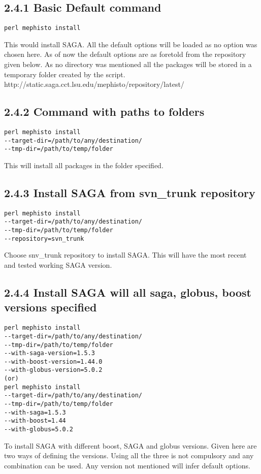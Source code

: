 \documentclass[a4paper,10pt]{article}
\begin{document}
\begin{multicols}{2}
\subsection*{\normalsize 2.4.1 Basic Default command}
\begin{verbatim}
perl mephisto install 
\end{verbatim}
This would install SAGA. All the default options will be loaded as no
option was chosen here. As of now the default options are as foretold 
from the repository given below. As no directory was mentioned all the 
packages will be stored in a temporary folder created by the script.
http://static.saga.cct.lsu.edu/mephisto/repository/latest/
\subsection*{\normalsize 2.4.2 Command with paths to folders}
\begin{verbatim}
perl mephisto install 
--target-dir=/path/to/any/destination/ 
--tmp-dir=/path/to/temp/folder 
\end{verbatim}
This will install all packages in the folder specified. 
\subsection*{\normalsize 2.4.3 Install SAGA from svn\_trunk repository}
\begin{verbatim}
perl mephisto install 
--target-dir=/path/to/any/destination/ 
--tmp-dir=/path/to/temp/folder 
--repository=svn_trunk
\end{verbatim}
Choose snv\_trunk repository to install SAGA. This will have the most
recent and tested working SAGA version. 
\subsection*{\normalsize 2.4.4 Install SAGA will all saga, globus, boost versions specified}
\begin{verbatim}
perl mephisto install 
--target-dir=/path/to/any/destination/ 
--tmp-dir=/path/to/temp/folder 
--with-saga-version=1.5.3 
--with-boost-version=1.44.0 
--with-globus-version=5.0.2
(or)
perl mephisto install 
--target-dir=/path/to/any/destination/ 
--tmp-dir=/path/to/temp/folder 
--with-saga=1.5.3 
--with-boost=1.44 
--with-globus=5.0.2
\end{verbatim}
To install SAGA with different boost, SAGA and globus versions.
Given here are two ways of defining the versions. Using all the three 
is not compulsory and any combination can be used. Any version 
not mentioned will infer default options. 

\end{multicols}
\end{document}
